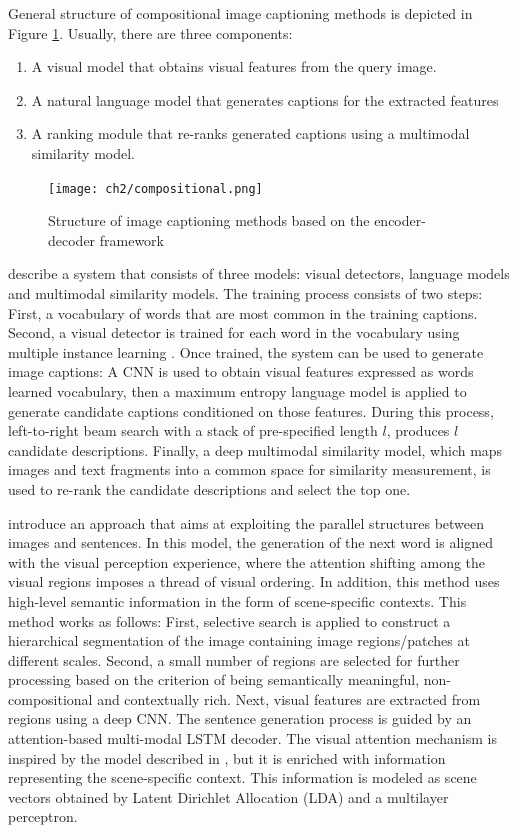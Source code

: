General structure of compositional image captioning methods is depicted in Figure \ref{fig:compositional}. Usually, there are three components: 
\begin{enumerate}
\item A visual model that obtains visual features from the query image.
\item A natural language model that generates captions for the extracted features
\item A ranking module that re-ranks generated captions using a multimodal similarity model.
\end{enumerate}

\begin{figure}[hpt]
	\centering
	\texttt{[image: ch2/compositional.png]}
	\caption{Structure of image captioning methods based on the encoder-decoder framework}
	\label{fig:compositional}
\end{figure}

\citet{Fang2015} describe a system that consists of three models: visual detectors, language models and multimodal similarity models. The training process consists of two steps: First, a vocabulary of words that are most common in the training captions. Second, a visual detector is trained for each word in the vocabulary using multiple instance learning  \citep{Viola2005}. Once trained, the system can be used to generate image captions: A CNN \citep{Krizhevsky2012} is used to obtain visual features expressed as words learned vocabulary, then a maximum entropy language model \citep{Berger1996} is applied to generate candidate captions conditioned on those features. During this process, left-to-right beam search \citep{Ratnaparkhi2000} with a stack of pre-specified length $l$, produces $l$ candidate descriptions. Finally, a deep multimodal similarity model, which maps images and text fragments into a common space for similarity measurement, is used to re-rank the candidate descriptions and select the top one.

\citet{Jin2015} introduce an approach that aims at exploiting the parallel structures between images and sentences. In this model, the generation of the next word is aligned with the visual perception experience, where the attention shifting among the visual regions imposes a thread of visual ordering. In addition, this method uses high-level semantic information in the form of scene-specific contexts. This method works as follows: First, selective search \citep{Uijlings2013} is applied to construct a hierarchical segmentation of the image containing image regions/patches at different scales. Second, a small number of regions are selected for further processing based on the criterion of being semantically meaningful, non-compositional and contextually rich. Next, visual features are extracted from regions using a deep CNN. The sentence generation process is guided by an attention-based multi-modal LSTM decoder. The visual attention mechanism is inspired by the model described in \citep{Xu2015}, but it is enriched with information representing the scene-specific context. This information is modeled as scene vectors obtained by Latent Dirichlet Allocation (LDA) \citep{Blei2003} and a multilayer perceptron.


